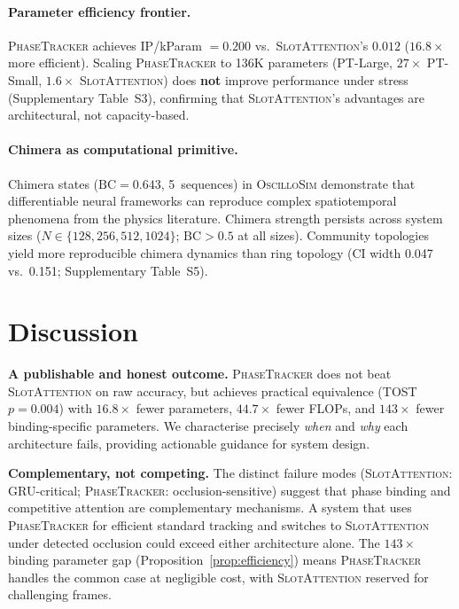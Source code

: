 \documentclass[11pt]{article}
\providecommand{\oscillosim}{\textnormal{\textsc{OscilloSim}}\xspace}
\providecommand{\pt}{\textnormal{\textsc{PhaseTracker}}\xspace}
\providecommand{\sa}{\textnormal{\textsc{SlotAttention}}\xspace}
\providecommand{\ip}{\text{IP}}
\providecommand{\bc}{\text{BC}}
\begin{document}
\paragraph{Parameter efficiency frontier.}
\pt achieves $\ip$/kParam $= 0.200$ vs.\ \sa's $0.012$
($16.8\times$ more efficient).  Scaling \pt to
136K parameters (PT-Large, $27\times$ PT-Small, $1.6\times$ \sa)
does \textbf{not} improve performance under stress (Supplementary
Table~S3), confirming that \sa's advantages are architectural, not
capacity-based.

\paragraph{Chimera as computational primitive.}
Chimera states ($\bc = 0.643$, 5~sequences) in \oscillosim demonstrate
that differentiable neural frameworks can reproduce complex
spatiotemporal phenomena from the physics literature.  Chimera
strength persists across system sizes ($N \in \{128, 256, 512,
1024\}$; $\bc > 0.5$ at all sizes).  Community topologies yield more
reproducible chimera dynamics than ring topology (CI width 0.047
vs.\ 0.151; Supplementary Table~S5).

\section{Discussion}
\label{sec:discussion}

\textbf{A publishable and honest outcome.}
\pt does not beat \sa on raw accuracy, but achieves practical
equivalence (TOST $p = 0.004$) with $16.8\times$ fewer parameters,
$44.7\times$ fewer FLOPs, and $143\times$ fewer binding-specific
parameters.  We characterise precisely \emph{when} and \emph{why}
each architecture fails, providing actionable guidance for system
design.

\textbf{Complementary, not competing.}
The distinct failure modes (\sa: GRU-critical; \pt: occlusion-sensitive)
suggest that phase binding and competitive attention are complementary
mechanisms.  A system that uses \pt for efficient standard tracking
and switches to \sa under detected occlusion could exceed either
architecture alone.  The $143\times$ binding parameter gap
(Proposition~\ref{prop:efficiency}) means \pt handles the common case
at negligible cost, with \sa reserved for challenging frames.
\end{document}
